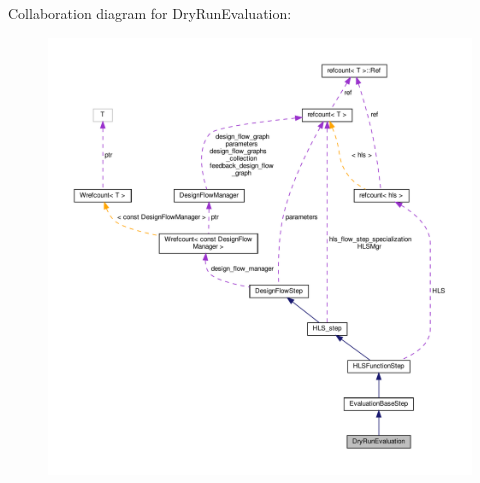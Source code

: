 Collaboration diagram for Dry\+Run\+Evaluation\+:
\nopagebreak
\begin{figure}[H]
\begin{center}
\leavevmode
\includegraphics[width=350pt]{d8/ddc/classDryRunEvaluation__coll__graph}
\end{center}
\end{figure}
